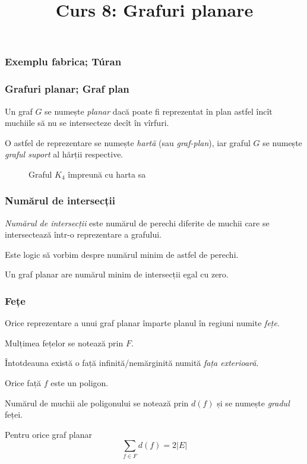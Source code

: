 
\title{Curs 8: Grafuri planare}



\maketitle

\begin{frame}
  \frametitle{Exemplu fabrica; T\' uran}

\end{frame}



\begin{frame}
  \frametitle{Grafuri planar; Graf plan}

Un graf $G$ se numește \emph{planar} dacă poate fi reprezentat în plan astfel încît muchiile să nu se intersecteze decît în vîrfuri. 

O astfel de reprezentare se numește \emph{hartă} (sau \emph{graf-plan}), iar graful $G$ se numește \emph{graful suport} al hărții respective. 

\begin{figure}
\centering%
\caption{Graful $K_4$ împreună cu harta sa}
\end{figure}

\end{frame}


\begin{frame}
  \frametitle{Numărul de intersecții}

\emph{Numărul de intersecții} este numărul de perechi diferite de muchii care se intersectează într-o reprezentare a grafului.

Este logic să vorbim despre numărul minim de astfel de perechi.

Un graf planar are numărul minim de intersecții egal cu zero.

\end{frame}

\begin{frame}
  \frametitle{Fețe}

Orice reprezentare a unui graf planar împarte planul în regiuni numite \emph{fețe}. 

Mulțimea fețelor se notează prin $F$. 

Întotdeauna există o față infinită/nemărginită numită \emph{fața exterioară}.

Orice față $f$ este un poligon. 

Numărul de muchii ale poligonului se notează prin $d(f)$ și se numește \emph{gradul} feței.

\begin{theorem}
Pentru orice graf planar
\[
 \sum_{f\in F} d(f) = 2|E|
\]
\end{theorem} 

\end{frame}

